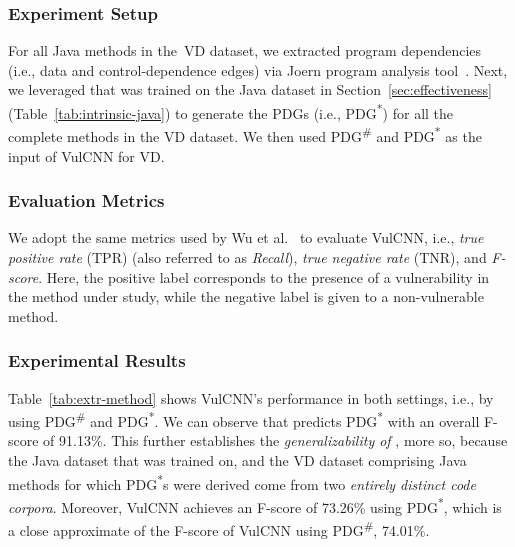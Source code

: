 \subsubsection*{\bf Experiment Setup}
For all Java methods in the~VD dataset, we extracted program
dependencies (i.e., data and control-dependence edges) via Joern
program analysis tool~\cite{joern-2014}. Next, we leveraged \tool that
was trained on the Java dataset in Section~\ref{sec:effectiveness}
(Table~\ref{tab:intrinsic-java}) to generate the PDGs (i.e.,
PDG\textsuperscript{*}) for all the complete methods in the VD
dataset. We then used PDG\textsuperscript{\#} and
PDG\textsuperscript{*} as the input of VulCNN for VD.

\subsubsection*{\bf Evaluation Metrics}
We adopt the same metrics used by Wu et al.~\cite{wu2022vulcnn} to
evaluate VulCNN, i.e., \textit{true positive rate} (TPR) (also
referred to as \textit{Recall}), \textit{true negative rate} (TNR),
and \textit{F-score}. Here, the positive label corresponds to the
presence of a vulnerability in the method under study, while the
negative label is given to a non-vulnerable method.


\subsubsection*{\bf Experimental Results}
Table~\ref{tab:extr-method} shows VulCNN's performance in both
settings, i.e., by using PDG\textsuperscript{\#} and
PDG\textsuperscript{*}. We can observe that \tool predicts
PDG\textsuperscript{*} with an overall F-score of 91.13\%. This
further establishes the {\em generalizability of \tool}, more so,
because the Java dataset that \tool was trained on, and the VD dataset
comprising Java methods for which PDG\textsuperscript{*}s were derived
come from two {\em entirely distinct code corpora}. Moreover, VulCNN
achieves an F-score of 73.26\% using PDG\textsuperscript{*}, which is
a close approximate of the F-score of VulCNN using
PDG\textsuperscript{\#}, 74.01\%.

